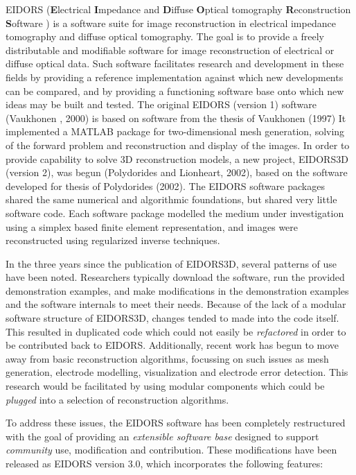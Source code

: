 \documentclass[12pt]{iopart}
\begin{document}
EIDORS
({\bf E}lectrical
 {\bf I}mpedance and
 {\bf D}iffuse
 {\bf O}ptical tomography
 {\bf R}econstruction
 {\bf S}oftware )
is a software suite for image reconstruction in
electrical impedance tomography and diffuse optical tomography.
The goal is to provide a freely distributable and modifiable
software for image reconstruction of electrical 
or diffuse optical data. Such software facilitates research
and development
in these fields by providing a reference implementation
against which new developments can be compared, and by
providing a functioning software base onto which new
ideas may be built and tested.
The original EIDORS (version 1) software (Vaukhonen \etal, 2000) 
is based on software from the thesis of Vaukhonen (1997)
It implemented a MATLAB package for two-dimensional mesh generation,
solving of the forward
problem and reconstruction and display of the images.
In order to provide capability to solve 3D reconstruction models,
a new project, EIDORS3D (version 2), was begun (Polydorides and Lionheart, 2002),
based on the software developed for thesis of Polydorides (2002).
The EIDORS software packages shared the same numerical
and algorithmic foundations, but shared very little software code.
Each software package modelled the medium under investigation
using a simplex based finite element representation,
and images were reconstructed using regularized inverse techniques.

In the three years since the publication of EIDORS3D, several patterns
of use have been noted. Researchers typically download the software,
run the provided demonstration examples,  and 
make modifications in the demonstration examples and the software
internals to meet their needs.
Because of the lack of a modular software structure of EIDORS3D,
changes tended to made into the code itself. This resulted in
duplicated
code which could not easily be {\em refactored} in order to
be contributed back to EIDORS. Additionally, recent work has begun to move
away from basic reconstruction algorithms, focussing
on such issues as mesh generation, electrode modelling, visualization
and electrode error detection. This research would be facilitated
by using modular components which could be {\em plugged} into
a selection of reconstruction algorithms.

To address these issues, the EIDORS software has been completely
restructured with the goal of providing an {\em extensible software base}
designed to support {\em community} use, modification and contribution.
These modifications have been released as EIDORS version 3.0,
which incorporates the following features:
\end{document}
